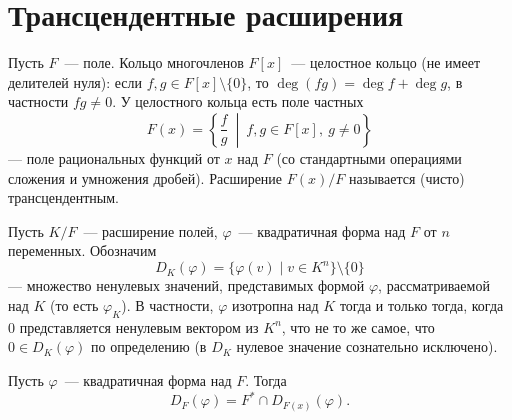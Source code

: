 \documentclass[12pt]{article}
\begin{document}
    \section{Трансцендентные расширения}
    
    \begin{definition}
    	Пусть $F$~--- поле. Кольцо многочленов $F[x]$~--- целостное кольцо (не имеет делителей нуля): если $f, g \in F[x] \setminus \{0\}$, то $\deg(fg) = \deg f + \deg g$, в частности $fg \neq 0$. У целостного кольца есть поле частных
    	\[
    	F(x) = \left\{ \frac{f}{g} \ \middle|\ f, g \in F[x],\ g \neq 0 \right\}
    	\]
    	--- поле рациональных функций от $x$ над $F$ (со стандартными операциями сложения и умножения дробей). Расширение $F(x)/F$ называется (чисто) трансцендентным.
    \end{definition}
    
    \begin{definition}
    	Пусть $K/F$~--- расширение полей, $\varphi$~--- квадратичная форма над $F$ от $n$ переменных. Обозначим
    	\[
    	D_K(\varphi) = \{ \varphi(v) \mid v \in K^n \} \setminus \{ 0 \}
    	\]
    	--- множество ненулевых значений, представимых формой $\varphi$, рассматриваемой над $K$ (то есть $\varphi_K$). В частности, $\varphi$ изотропна над $K$ тогда и только тогда, когда $0$ представляется ненулевым вектором из $K^n$, что не то же самое, что $0 \in D_K(\varphi)$ по определению (в $D_K$ нулевое значение сознательно исключено).
    \end{definition}
    
    \begin{theorem}
    	Пусть $\varphi$~--- квадратичная форма над $F$. Тогда
    	\[
    	D_F(\varphi) = F^* \cap D_{F(x)}(\varphi).
    	\]
    \end{theorem}
    
\end{document}
